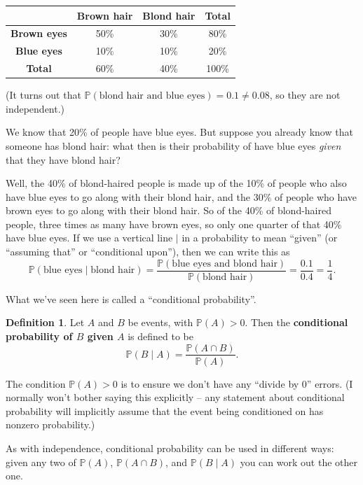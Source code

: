 \documentclass[
  a4paper,
]{book}
\theoremstyle{definition}
\newtheorem{definition}{Definition}[chapter]
\theoremstyle{definition}
\theoremstyle{definition}
\theoremstyle{definition}
\theoremstyle{remark}
\begin{document}
\begin{longtable}[]{@{}cccc@{}}
\toprule
& \textbf{Brown hair} & \textbf{Blond hair} & \textbf{Total} \\
\midrule
\endhead
\textbf{Brown eyes} & 50\% & 30\% & 80\% \\
\textbf{Blue eyes} & 10\% & 10\% & 20\% \\
\textbf{Total} & 60\% & 40\% & 100\% \\
\bottomrule
\end{longtable}

(It turns out that \(\mathbb P(\text{blond hair and blue eyes}) = 0.1 \neq 0.08\), so they are not independent.)

We know that 20\% of people have blue eyes. But suppose you already know that someone has blond hair: what then is their probability of have blue eyes \emph{given} that they have blond hair?

Well, the 40\% of blond-haired people is made up of the 10\% of people who also have blue eyes to go along with their blond hair, and the 30\% of people who have brown eyes to go along with their blond hair. So of the 40\% of blond-haired people, three times as many have brown eyes, so only one quarter of that 40\% have blue eyes. If we use a vertical line \(|\) in a probability to mean ``given'' (or ``assuming that'' or ``conditional upon''), then we can write this as
\[  \mathbb P(\text{blue eyes} \mid \text{blond hair}) = \frac{\mathbb P(\text{blue eyes and blond hair})}{\mathbb P(\text{blond hair})} = \frac{0.1}{0.4} = \frac14. \]

What we've seen here is called a ``conditional probability''.

\begin{definition}
Let \(A\) and \(B\) be events, with \(\mathbb P(A) > 0\). Then the \textbf{conditional probability of \(B\) given \(A\)} is defined to be
\[  \mathbb P(B \mid A) = \frac{\mathbb P(A \cap B)}{\mathbb P(A)} . \]
\end{definition}

The condition \(\mathbb P(A) > 0\) is to ensure we don't have any ``divide by 0'' errors. (I normally won't bother saying this explicitly -- any statement about conditional probability will implicitly assume that the event being conditioned on has nonzero probability.)

As with independence, conditional probability can be used in different ways: given any two of \(\mathbb P(A)\), \(\mathbb P(A \cap B)\), and \(\mathbb P(B \mid A)\) you can work out the other one.
\end{document}

